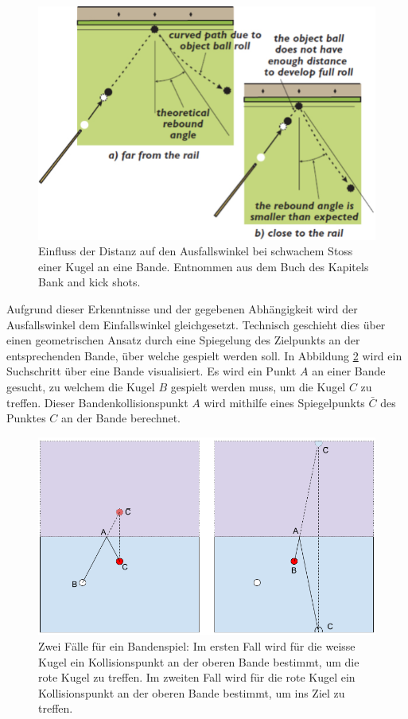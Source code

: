 \begin{figure}[h!]
    \begin{center}
        \includegraphics[width=0.4\linewidth]{../common/03_billiard_ai/resources/58_rebound_angle_no_spin_slow_shot_distance.png}
    \end{center}
    \caption{Einfluss der Distanz auf den Ausfallswinkel bei schwachem Stoss einer Kugel an eine Bande.
    Entnommen aus dem Buch \cite{book:the_ilustrated_principles_of_pool_and_billiards} des Kapitels  Bank and kick shots\grqq.}
    \label{fig:rebound_angle_no_spin_slow_shot_distance}
\end{figure}

\newpage
Aufgrund dieser Erkenntnisse und der gegebenen Abhängigkeit wird der Ausfallswinkel dem Einfallswinkel gleichgesetzt.
Technisch geschieht dies über einen geometrischen Ansatz durch eine Spiegelung \cite{math.stackexchange:1}
des Zielpunkts an der entsprechenden Bande, über welche gespielt werden soll.
In Abbildung \ref{fig:Tiefe über Bande erreichen mittels Reflektion} wird ein Suchschritt über eine Bande visualisiert.
Es wird ein Punkt $A$ an einer Bande gesucht, zu welchem die Kugel $B$ gespielt werden muss, um die Kugel $C$ zu treffen.
Dieser Bandenkollisionspunkt $A$ wird mithilfe eines Spiegelpunkts $\bar{C}$ des Punktes $C$ an der Bande berechnet.

\begin{figure}[h!]
    \begin{center}
        \includegraphics[width=0.5\linewidth]{../common/03_billiard_ai/resources/47_rail_reflection_1.png}
    \end{center}
    \caption{Zwei Fälle für ein Bandenspiel:
    Im ersten Fall wird für die weisse Kugel ein Kollisionspunkt an der oberen Bande bestimmt, um die rote Kugel zu treffen.
    Im zweiten Fall wird für die rote Kugel ein Kollisionspunkt an der oberen Bande bestimmt, um ins Ziel zu treffen.
    }
    \label{fig:Tiefe über Bande erreichen mittels Reflektion}
\end{figure}

